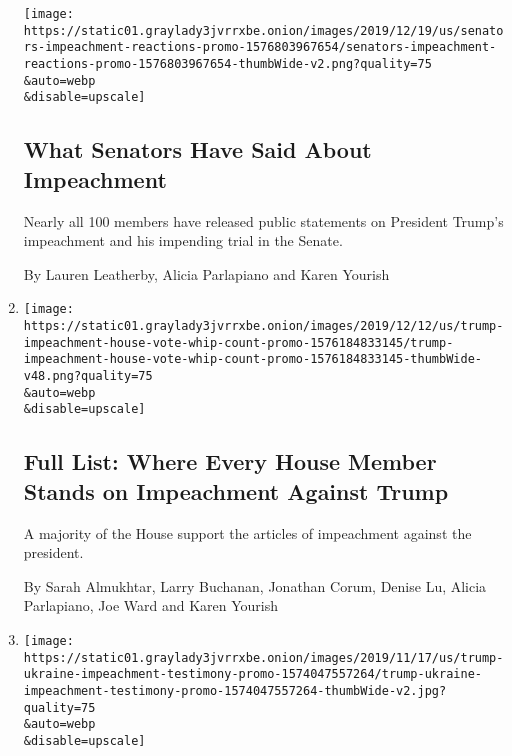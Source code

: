 \begin{enumerate}
  \texttt{[image: https://static01.graylady3jvrrxbe.onion/images/2019/12/19/us/senators-impeachment-reactions-promo-1576803967654/senators-impeachment-reactions-promo-1576803967654-thumbWide-v2.png?quality=75\\\&auto=webp\\\&disable=upscale]}

  \hypertarget{what-senators-have-said-about-impeachment}{%
  \subsection{What Senators Have Said About
  Impeachment}\label{what-senators-have-said-about-impeachment}}

  Nearly all 100 members have released public statements on President
  Trump's impeachment and his impending trial in the Senate.

  By Lauren Leatherby, Alicia Parlapiano and Karen Yourish
\item
  \href{/interactive/2019/12/12/us/politics/trump-impeachment-house-vote-whip-count.html}{}

  \texttt{[image: https://static01.graylady3jvrrxbe.onion/images/2019/12/12/us/trump-impeachment-house-vote-whip-count-promo-1576184833145/trump-impeachment-house-vote-whip-count-promo-1576184833145-thumbWide-v48.png?quality=75\\\&auto=webp\\\&disable=upscale]}

  \hypertarget{full-list-where-every-house-member-stands-on-impeachment-against-trump}{%
  \subsection{Full List: Where Every House Member Stands on Impeachment
  Against
  Trump}\label{full-list-where-every-house-member-stands-on-impeachment-against-trump}}

  A majority of the House support the articles of impeachment against
  the president.

  By Sarah Almukhtar, Larry Buchanan, Jonathan Corum, Denise Lu, Alicia
  Parlapiano, Joe Ward and Karen Yourish
\item
  \href{/interactive/2019/11/18/us/politics/trump-ukraine-impeachment-testimony.html}{}

  \texttt{[image: https://static01.graylady3jvrrxbe.onion/images/2019/11/17/us/trump-ukraine-impeachment-testimony-promo-1574047557264/trump-ukraine-impeachment-testimony-promo-1574047557264-thumbWide-v2.jpg?quality=75\\\&auto=webp\\\&disable=upscale]}

  \hypertarget{a-threat-a-drug-deal-and-a-troubling-call-key-testimony-in-the-impeachment-inquiry}{%
}
\end{enumerate}
